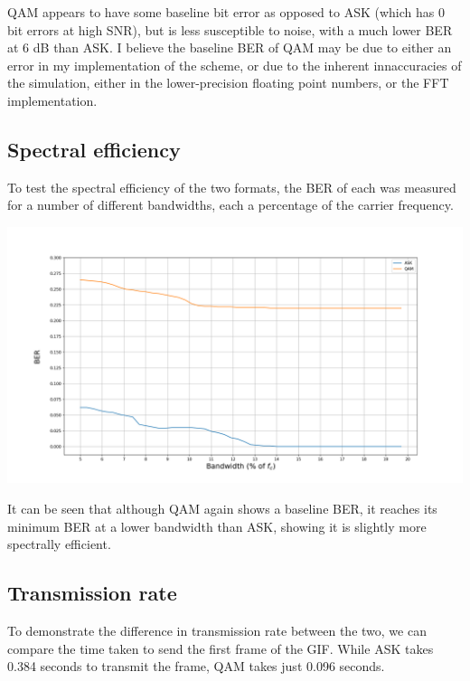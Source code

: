 \documentclass{article}
\begin{document}
QAM appears to have some baseline bit error as opposed to ASK (which has 0 bit errors at high SNR), but is less susceptible to noise, with a much lower BER at 6 dB than ASK. I believe the baseline BER of QAM may be due to either an error in my implementation of the scheme, or due to the inherent innaccuracies of the simulation, either in the lower-precision floating point numbers, or the FFT implementation.

\subsection{Spectral efficiency}
To test the spectral efficiency of the two formats, the BER of each was measured for a number of different bandwidths, each a percentage of the carrier frequency. 

\noindent
\includegraphics[width=\textwidth]{figures/bandwidth.png}

It can be seen that although QAM again shows a baseline BER, it reaches its minimum BER at a lower bandwidth than ASK, showing it is slightly more spectrally efficient. 

\subsection{Transmission rate}
To demonstrate the difference in transmission rate between the two, we can compare the time taken to send the first frame of the GIF. While ASK takes 0.384 seconds to transmit the frame, QAM takes just 0.096 seconds. 
\end{document}
